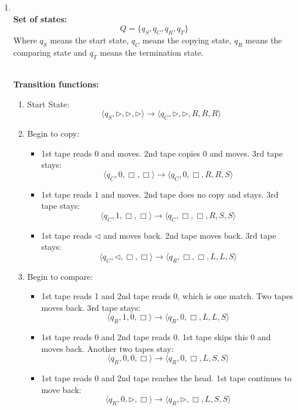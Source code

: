 \documentclass[12pt,a4paper]{article}
\makeatletter
\newtheorem*{solution}{Solution}
\theoremstyle{definition}
\renewenvironment{solution}[1][Solution] {\par\pushQED{\qed}\normalfont\topsep6\p@\@plus6\p@\relax\trivlist\item[\hskip\labelsep\bfseries#1\@addpunct{.}]\ignorespaces}{\popQED\endtrivlist\@endpefalse} \makeatother
\makeatother
\begin{document}
\begin{enumerate}
\begin{enumerate}
\begin{solution}
	    ~\\
	    \textbf{Set of states:}
	    $$
	    Q=\{q_S,q_C,q_R, q_T\}
	    $$
	    Where $q_S$ means the start state, $q_C$ means the copying state, $q_R$ means the comparing state and $q_T$ means the termination state.
	    
	    ~\\
	    \textbf{Transition functions:}
	    
	    \begin{enumerate}
	        \item Start State:
	        $$
	        \langle q_S, \triangleright, \triangleright,\triangleright \rangle \rightarrow \langle q_C,\triangleright,\triangleright,R,R,R \rangle
	        $$
	        \item Begin to copy:
	        \begin{itemize}
	        \item 1st tape reads $0$ and moves. 2nd tape copies $0$ and moves. 3rd tape stays:
	        $$
	        \langle q_C,0,\Box,\Box  \rangle \rightarrow \langle q_C,0,\Box,R,R,S \rangle
	        $$
	        \item 1st tape reads $1$ and moves. 2nd tape does no copy and stays. 3rd tape stays:
	        $$
	        \langle q_C,1,\Box,\Box  \rangle \rightarrow \langle q_C,\Box,\Box,R,S,S \rangle
	        $$
	        \item 1st tape reads $\triangleleft$ and moves back. 2nd tape moves back. 3rd tape stays:
	        $$
	        \langle q_C,\triangleleft,\Box,\Box  \rangle \rightarrow \langle q_R,\Box,\Box,L,L,S \rangle
	        $$
	        \end{itemize}
	        \item Begin to compare:
	        \begin{itemize}
	            \item 1st tape reads 1 and 2nd tape reads 0, which is one match. Two tapes moves back. 3rd tape stays:
	            $$
	        \langle q_R,1,0,\Box  \rangle \rightarrow \langle q_R,0,\Box,L,L,S \rangle
	        $$
	        \item 1st tape reads 0 and 2nd tape reads 0. 1st tape skips this 0 and moves back. Another two tapes stay:
	         $$
	        \langle q_R,0,0,\Box  \rangle \rightarrow \langle q_R,0,\Box,L,S,S \rangle
	        $$
	        \item 1st tape reads 0 and 2nd tape reaches the head. 1st tape continues to move back:
	         $$
	        \langle q_R,0,\triangleright,\Box  \rangle \rightarrow \langle q_R,\triangleright,\Box,L,S,S \rangle
$$
\end{itemize}
\end{enumerate}
\end{solution}
\end{enumerate}
\end{enumerate}
\end{document}
